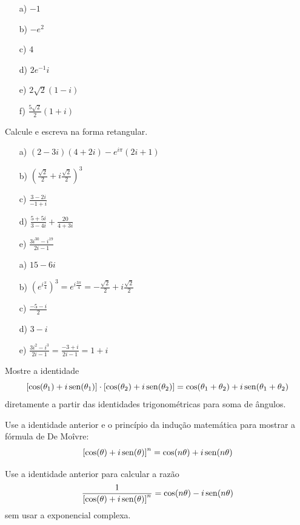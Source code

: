 \begin{Answer}
\begin{itemize}
\item[a)] $-1$
\item[b)] $-e^2$
\item[c)] $4$
\item[d)] $2e^{-1}i$
\item[e)] $2\sqrt{2}\left(1-i\right)$
\item[f)] $\frac{5\sqrt{2}}{2}\left(1+i\right)$
\end{itemize}
 \end{Answer}
\begin{Exercise}Calcule e escreva na forma retangular.
\begin{itemize}
\item[a)] $(2-3i)(4+2i)-e^{i\pi }(2i+1)$
\item[b)] $\left(\frac{\sqrt{2}}{2}+i\frac{\sqrt{2}}{2}\right)^3$
\item[c)] $\frac{3-2i}{-1+i}$
\item[d)] $\frac{5+5i}{3-4i}+\frac{20}{4+3i}$
\item[e)] $\frac{3i^{30}-i^{19}}{2i-1}$
\end{itemize}
\end{Exercise}
\begin{Answer}
\begin{itemize}
\item [a)]$15-6i$
\item [b)]$\left(e^{i\frac{\pi}{4}}\right)^3=e^{i\frac{3\pi}{4}}=-\frac{\sqrt{2}}{2}+i\frac{\sqrt{2}}{2}$
\item [c)]$\frac{-5-i}{2}$
\item [d)]$3-i$
\item [e)]$\frac{3i^{2}-i^{3}}{2i-1}=\frac{-3+i}{2i-1}=1+i$
\end{itemize}
\end{Answer}
\begin{Exercise}Mostre a identidade 
$$\left[\cos(\theta_1)+i\operatorname{sen}(\theta_1)\right]\cdot\left[\cos(\theta_2)+i\operatorname{sen}(\theta_2)\right]=\cos(\theta_1+\theta_2)+i\operatorname{sen}(\theta_1+\theta_2)$$
diretamente a partir das identidades trigonométricas para soma de ângulos.
\end{Exercise}
\begin{Exercise}Use a identidade anterior e o princípio da indução matemática para mostrar a fórmula de De Moîvre:
$$\left[\cos(\theta)+i\operatorname{sen}(\theta)\right]^n=\cos(n\theta)+i\operatorname{sen}(n\theta)$$
\end{Exercise}
\begin{Exercise}Use a identidade anterior para calcular a razão
$$\frac{1}{\left[\cos(\theta)+i\operatorname{sen}(\theta)\right]^n}=\cos(n\theta)-i\operatorname{sen}(n\theta)$$
sem usar a exponencial complexa.
\end{Exercise}
